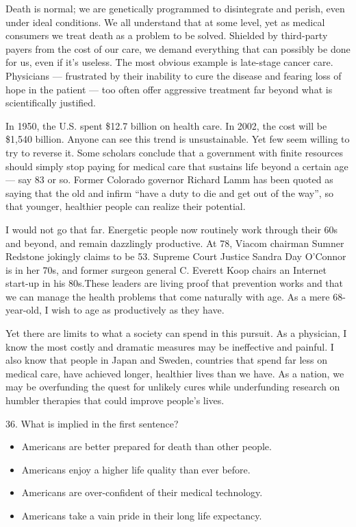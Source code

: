 \documentclass[UTF8,11pt]{ctexart}
\begin{document}
Death is normal; we are genetically programmed to disintegrate and perish, even under ideal conditions. We all understand that at some level, yet as medical consumers we treat death as a problem to be solved. Shielded by third-party payers from the cost of our care, we demand everything that can possibly be done for us, even if it’s useless. The most obvious example is late-stage cancer care. Physicians — frustrated by their inability to cure the disease and fearing loss of hope in the patient — too often offer aggressive treatment far beyond what is scientifically justified.


In 1950, the U.S. spent \$12.7 billion on health care. In 2002, the cost will be \$1,540 billion. Anyone can see this trend is unsustainable. Yet few seem willing to try to reverse it. Some scholars conclude that a government with finite resources should simply stop paying for medical care that sustains life beyond a certain age — say 83 or so. Former Colorado governor Richard Lamm has been quoted as saying that the old and infirm “have a duty to die and get out of the way”, so that younger, healthier people can realize their potential.


I would not go that far. Energetic people now routinely work through their 60s and beyond, and remain dazzlingly productive. At 78, Viacom chairman Sumner Redstone jokingly claims to be 53. Supreme Court Justice Sandra Day O’Connor is in her 70s, and former surgeon general C. Everett Koop chairs an Internet start-up in his 80s.These leaders are living proof that prevention works and that we can manage the health problems that come naturally with age. As a mere 68-year-old, I wish to age as productively as they have.


Yet there are limits to what a society can spend in this pursuit. As a physician, I know the most costly and dramatic measures may be ineffective and painful. I also know that people in Japan and Sweden, countries that spend far less on medical care, have achieved longer, healthier lives than we have. As a nation, we may be overfunding the quest for unlikely cures while underfunding research on humbler therapies that could improve people’s lives.


36. What is implied in the first sentence?


\begin{itemize}[leftmargin=2em,itemsep=.2em,topsep=.4em]\item[A.] Americans are better prepared for death than other people.
\item[B.] Americans enjoy a higher life quality than ever before.
\item[C.] Americans are over-confident of their medical technology.
\item[D.] Americans take a vain pride in their long life expectancy.
\end{itemize}
\end{document}
